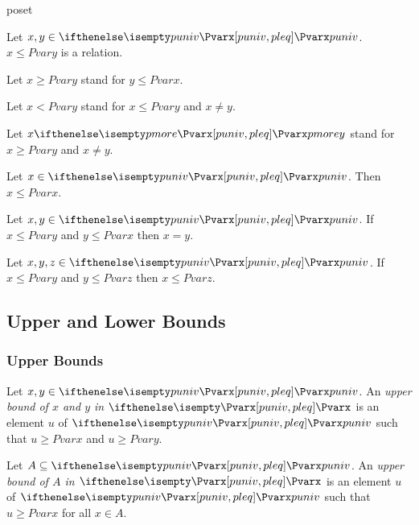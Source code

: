 \documentclass{stex}
\begin{document}
\begin{smodule}{poset}
  \begin{forthel}
    \begin{signature}
      Let $x, y \in \univ{Pvar}$.
      $x \leq{Pvar} y$ is a relation.
    \end{signature}

    Let $x \geq{Pvar} y$ stand for $y \leq{Pvar} x$.

    Let $x \less{Pvar} y$ stand for $x \leq{Pvar} y$ and $x\neq y$.

    Let $x \more{Pvar} y$ stand for $x \geq{Pvar} y$ and $x\neq y$.

    \begin{axiom}[Reflexivity]
      Let $x \in \univ{Pvar}$.
      Then $x \leq{Pvar} x$.
    \end{axiom}

    \begin{axiom}[Antisymmetry]
      Let $x, y \in \univ{Pvar}$.
      If $x \leq{Pvar} y$ and $y \leq{Pvar} x$ then $x=y$.
    \end{axiom}

    \begin{axiom}[Transitivity]
      Let $x, y, z \in \univ{Pvar}$.
      If $x \leq{Pvar} y$ and $y \leq{Pvar} z$ then $x \leq{Pvar} z$.
    \end{axiom}
  \end{forthel}

  \subsection{Upper and Lower Bounds}

  \subsubsection{Upper Bounds}

  \begin{forthel}
    \begin{definition}
      Let $x, y \in \univ{Pvar}$.
      An \emph{upper bound of $x$ and $y$ in $\Pvar{}$} is an element $u$ of $\univ{Pvar}$ such that $u \geq{Pvar} x$ and $u \geq{Pvar} y$.
    \end{definition}
    
    \begin{definition}
      Let $A \subseteq \univ{Pvar}$.
      An \emph{upper bound of $A$ in $\Pvar{}$} is an element $u$ of $\univ{Pvar}$ such that $u \geq{Pvar} x$ for all $x \in A$.
    \end{definition}
  \end{forthel}


\end{smodule}
\end{document}

